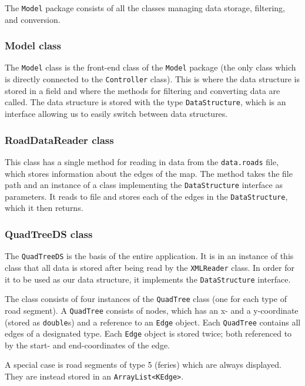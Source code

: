 The \texttt{Model} package consists of all the classes managing data storage, filtering, and conversion.

\subsubsection{Model class} %
The \texttt{Model} class is the front-end class of the \texttt{Model} package (the only class which is directly connected to the \texttt{Controller} class). This is where the data structure is stored in a field and where the methods for filtering and converting data are called. The data structure is stored with the type \texttt{DataStructure}, which is an interface allowing us to easily switch between data structures.

\subsubsection{RoadDataReader class}
This class has a single method for reading in data from the \texttt{data.roads} file, which stores information about the edges of the map. The method takes the file path and an instance of a class implementing the \texttt{DataStructure} interface as parameters. It reads to file and stores each of the edges in the \texttt{DataStructure}, which it then returns.

\subsubsection{QuadTreeDS class} %
The \texttt{QuadTreeDS} is the basis of the entire application. It is in an instance of this class that all data is stored after being read by the \texttt{XMLReader} class. In order for it to be used as our data structure, it implements the \texttt{DataStructure} interface.

The class consists of four instances of the \texttt{QuadTree} class (one for each type of road segment). A \texttt{QuadTree} consists of nodes, which has an x- and a y-coordinate (stored as \texttt{double}s) and a reference to an \texttt{Edge} object. Each \texttt{QuadTree} contains all edges of a designated type. Each \texttt{Edge} object is stored twice; both referenced to by the start- and end-coordinates of the edge.

A special case is road segments of type 5 (feries) which are always displayed. They are instead stored in an \texttt{ArrayList<KEdge>}.

